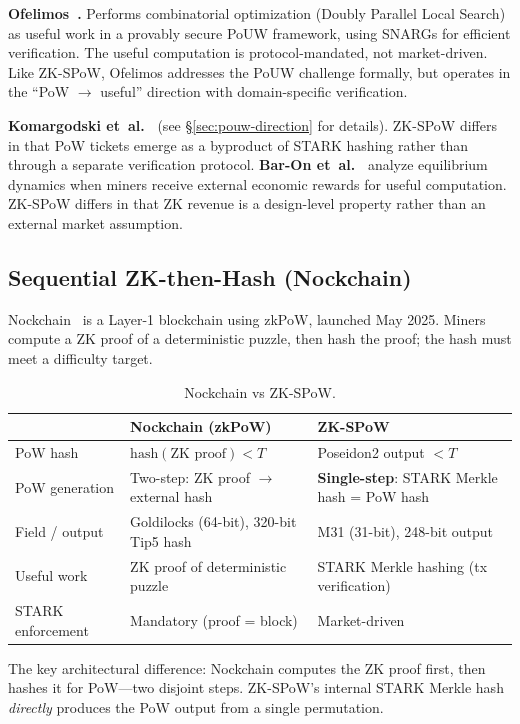 \documentclass[11pt,a4paper]{article}
\begin{document}
\textbf{Ofelimos~\cite{ofelimos}.} Performs combinatorial optimization (Doubly Parallel Local Search) as useful work in a provably secure PoUW framework, using SNARGs for efficient verification. The useful computation is protocol-mandated, not market-driven. Like ZK-SPoW, Ofelimos addresses the PoUW challenge formally, but operates in the ``PoW $\to$ useful'' direction with domain-specific verification.

\textbf{Komargodski et~al.~\cite{komargodski2025}} (see \S\ref{sec:pouw-direction} for details). ZK-SPoW differs in that PoW tickets emerge as a byproduct of STARK hashing rather than through a separate verification protocol. \textbf{Bar-On et~al.~\cite{baron2025}} analyze equilibrium dynamics when miners receive external economic rewards for useful computation. ZK-SPoW differs in that ZK revenue is a design-level property rather than an external market assumption.

\subsection{Sequential ZK-then-Hash (Nockchain)}

Nockchain~\cite{nockchain} is a Layer-1 blockchain using zkPoW, launched May 2025. Miners compute a ZK proof of a deterministic puzzle, then hash the proof; the hash must meet a difficulty target.

\begin{table}[h]
\centering
\small
\begin{tabular}{@{}lp{}p{}@{}}
\toprule
& Nockchain (zkPoW) & ZK-SPoW \\
\midrule
PoW hash & $\mathrm{hash}(\text{ZK proof}) < T$ & Poseidon2 output $< T$ \\
PoW generation & Two-step: ZK proof $\to$ external hash & \textbf{Single-step}: STARK Merkle hash = PoW hash \\
Field / output & Goldilocks (64-bit), 320-bit Tip5 hash & M31 (31-bit), 248-bit output \\
Useful work & ZK proof of deterministic puzzle & STARK Merkle hashing (tx verification) \\
STARK enforcement & Mandatory (proof = block) & Market-driven \\
\bottomrule
\end{tabular}
\caption{Nockchain vs ZK-SPoW.}
\label{tab:nockchain}
\end{table}

The key architectural difference: Nockchain computes the ZK proof first, then hashes it for PoW---two disjoint steps. ZK-SPoW's internal STARK Merkle hash \emph{directly} produces the PoW output from a single permutation.
\end{document}
